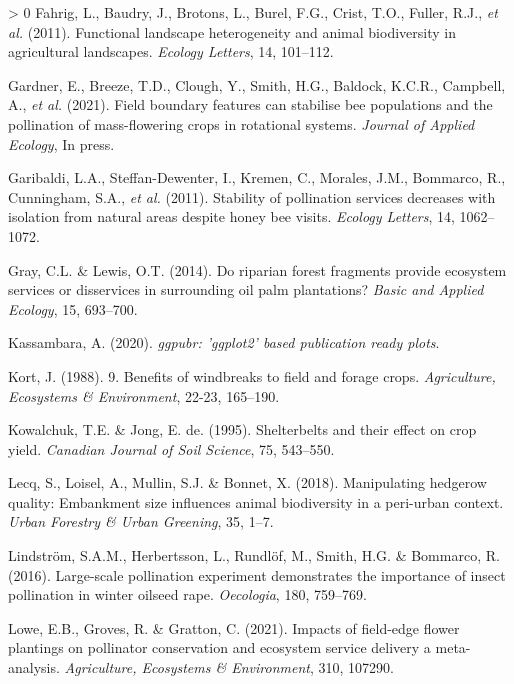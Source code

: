 \documentclass[]{elsarticle} %
\newlength{\cslhangindent}
\newenvironment{CSLReferences}[3] %
 {%
  \setlength{\parindent}{0pt}
  \ifodd #1 \everypar{\setlength{\hangindent}{\cslhangindent}}\ignorespaces\fi
  \ifnum #2 > 0
  \setlength{\parskip}{#2\baselineskip}
  \fi
 }%
 {}
\begin{document}
\begin{CSLReferences}{1}{0}
\leavevmode\hypertarget{ref-fahrig2011}{}%
Fahrig, L., Baudry, J., Brotons, L., Burel, F.G., Crist, T.O., Fuller, R.J., \emph{et al.} (2011). Functional landscape heterogeneity and animal biodiversity in agricultural landscapes. \emph{Ecology Letters}, 14, 101--112.

\leavevmode\hypertarget{ref-gardner2021}{}%
Gardner, E., Breeze, T.D., Clough, Y., Smith, H.G., Baldock, K.C.R., Campbell, A., \emph{et al.} (2021). Field boundary features can stabilise bee populations and the pollination of mass-flowering crops in rotational systems. \emph{Journal of Applied Ecology}, In press.

\leavevmode\hypertarget{ref-garibaldi2011}{}%
Garibaldi, L.A., Steffan-Dewenter, I., Kremen, C., Morales, J.M., Bommarco, R., Cunningham, S.A., \emph{et al.} (2011). Stability of pollination services decreases with isolation from natural areas despite honey bee visits. \emph{Ecology Letters}, 14, 1062--1072.

\leavevmode\hypertarget{ref-gray2014}{}%
Gray, C.L. \& Lewis, O.T. (2014). Do riparian forest fragments provide ecosystem services or disservices in surrounding oil palm plantations? \emph{Basic and Applied Ecology}, 15, 693--700.

\leavevmode\hypertarget{ref-kassambara2020}{}%
Kassambara, A. (2020). \emph{{ggpubr}: 'ggplot2' based publication ready plots}.

\leavevmode\hypertarget{ref-kort1988}{}%
Kort, J. (1988). 9. Benefits of windbreaks to field and forage crops. \emph{Agriculture, Ecosystems {\&} Environment}, 22-23, 165--190.

\leavevmode\hypertarget{ref-kowalchuk1995}{}%
Kowalchuk, T.E. \& Jong, E. de. (1995). Shelterbelts and their effect on crop yield. \emph{Canadian Journal of Soil Science}, 75, 543--550.

\leavevmode\hypertarget{ref-lecq2018}{}%
Lecq, S., Loisel, A., Mullin, S.J. \& Bonnet, X. (2018). Manipulating hedgerow quality: Embankment size influences animal biodiversity in a peri-urban context. \emph{Urban Forestry {\&} Urban Greening}, 35, 1--7.

\leavevmode\hypertarget{ref-lindstrom2016}{}%
Lindström, S.A.M., Herbertsson, L., Rundlöf, M., Smith, H.G. \& Bommarco, R. (2016). Large-scale pollination experiment demonstrates the importance of insect pollination in winter oilseed rape. \emph{Oecologia}, 180, 759--769.

\leavevmode\hypertarget{ref-lowe2021}{}%
Lowe, E.B., Groves, R. \& Gratton, C. (2021). Impacts of field-edge flower plantings on pollinator conservation and ecosystem service delivery {{}} a meta-analysis. \emph{Agriculture, Ecosystems {\&} Environment}, 310, 107290.


\end{CSLReferences}
\end{document}
